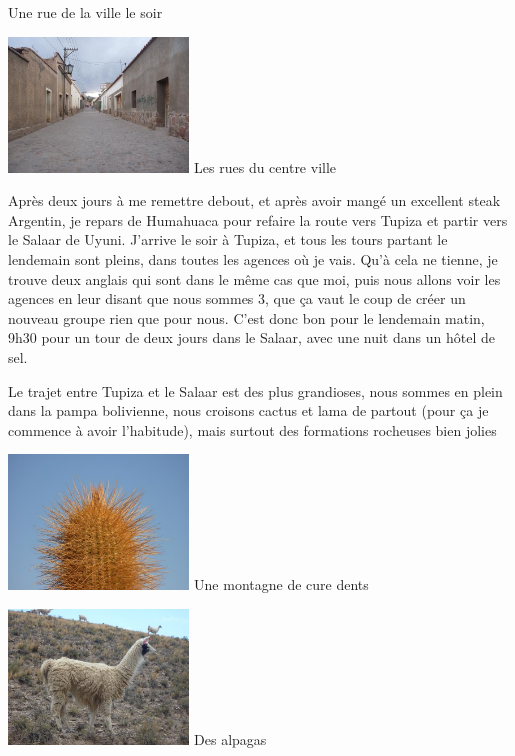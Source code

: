 \begin{multicols}{2}
Une rue de la ville le soir

\hspace*{-0.65cm}
\includegraphics[width=4.8cm]{articles/La-paz-humahuaca-et-salaar/1257387531xqvF.jpg}
Les rues du centre ville

Après deux jours à me remettre debout, et après avoir mangé un excellent steak Argentin, je repars de Humahuaca pour refaire la route vers Tupiza et partir vers le Salaar de Uyuni. J'arrive le soir à Tupiza, et tous les tours partant le lendemain sont pleins, dans toutes les agences où je vais. Qu'à cela ne tienne, je trouve deux anglais qui sont dans le même cas que moi, puis nous allons voir les agences en leur disant que nous sommes 3, que ça vaut le coup de créer un nouveau groupe rien que pour nous. C'est donc bon pour le lendemain matin, 9h30 pour un tour de deux jours dans le Salaar, avec une nuit dans un hôtel de sel.

Le trajet entre Tupiza et le Salaar est des plus grandioses, nous sommes en plein dans la pampa bolivienne, nous croisons cactus et lama de partout (pour ça je commence à avoir l'habitude), mais surtout des formations rocheuses bien jolies

\hspace*{-0.65cm}
\includegraphics[width=4.8cm]{articles/La-paz-humahuaca-et-salaar/12572037289e7N.jpg}
Une montagne de cure dents

\hspace*{-0.65cm}
\includegraphics[width=4.8cm]{articles/La-paz-humahuaca-et-salaar/1257387254hVhj.jpg}
Des alpagas


\end{multicols}
